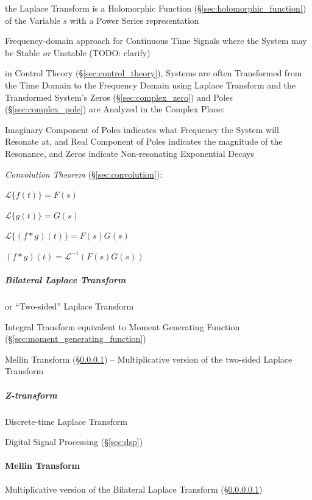 {the Laplace Transform is a Holomorphic Function
(\S\ref{sec:holomorphic_function}) of the Variable $s$ with a Power Series
representation

Frequency-domain approach for Continuous Time Signals where the System may be
Stable \emph{or} Unstable (TODO: clarify)

in Control Theory (\S\ref{sec:control_theory}), Systems are often Transformed
from the Time Domain to the Frequency Domain using Laplace Transform and the
Transformed System's Zeros (\S\ref{sec:complex_zero}) and Poles
(\S\ref{sec:complex_pole}) are Analyzed in the Complex Plane:

Imaginary Component of Poles indicates what Frequency the System will Resonate
at, and Real Component of Poles indicates the magnitude of the Resonance, and
Zeros indicate Non-resonating Exponential Decays


\emph{Convolution Theorem} (\S\ref{sec:convolution}):

$\mathcal{L}\{f(t)\} = F(s)$

$\mathcal{L}\{g(t)\} = G(s)$

$\mathcal{L}\{(f * g)(t)\} = F(s)G(s)$

$(f*g)(t) = \mathcal{L}^{-1}(F(s)G(s))$



\subparagraph{Bilateral Laplace Transform}\label{sec:bilateral_laplace}\hfill

or ``Two-sided'' Laplace Transform

Integral Transform equivalent to Moment Generating Function
(\S\ref{sec:moment_generating_function})

\fist Mellin Transform (\S\ref{sec:mellin_transform}) -- Multiplicative version
of the two-sided Laplace Transform



\subparagraph{Z-transform}\label{sec:z_transform}\hfill

Discrete-time Laplace Transform

Digital Signal Processing (\S\ref{sec:dsp})



\paragraph{Mellin Transform}\label{sec:mellin_transform}\hfill

Multiplicative version of the Bilateral Laplace Transform
(\S\ref{sec:bilateral_laplace})



}
